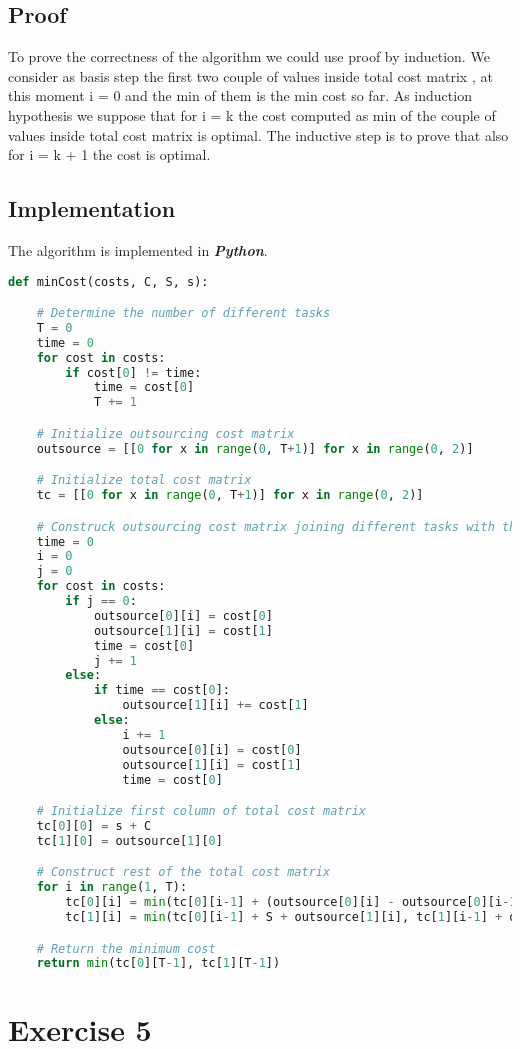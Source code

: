 \documentclass[11pt]{article}
\begin{document}
\subsection{Proof}
To prove the correctness of the algorithm we could use proof by induction.
We consider as basis step the first two couple of values inside total cost matrix , at this moment i = 0
and the min of them is the min cost so far. As induction hypothesis we suppose that for i = k the
cost computed as min of the couple of values inside total cost matrix is optimal. The inductive step is to
prove that also for i = k + 1 the cost is optimal.

\subsection{Implementation}
The algorithm is implemented in \textit{\textbf{Python}}.
\begin{lstlisting}[language=Python, caption=minCost]
def minCost(costs, C, S, s):

	# Determine the number of different tasks
	T = 0
	time = 0
	for cost in costs:
		if cost[0] != time:
			time = cost[0]
			T += 1

	# Initialize outsourcing cost matrix
	outsource = [[0 for x in range(0, T+1)] for x in range(0, 2)]

	# Initialize total cost matrix
	tc = [[0 for x in range(0, T+1)] for x in range(0, 2)]

	# Construck outsourcing cost matrix joining different tasks with the same timestamp
	time = 0
	i = 0
	j = 0
	for cost in costs:
		if j == 0:
			outsource[0][i] = cost[0]
			outsource[1][i] = cost[1]
			time = cost[0]
			j += 1
		else:
			if time == cost[0]:
				outsource[1][i] += cost[1]
			else:
				i += 1
				outsource[0][i] = cost[0]
				outsource[1][i] = cost[1]
				time = cost[0]

	# Initialize first column of total cost matrix 
	tc[0][0] = s + C
	tc[1][0] = outsource[1][0]

	# Construct rest of the total cost matrix 
	for i in range(1, T):
		tc[0][i] = min(tc[0][i-1] + (outsource[0][i] - outsource[0][i-1]) * s, tc[1][i-1] + C + s)
		tc[1][i] = min(tc[0][i-1] + S + outsource[1][i], tc[1][i-1] + outsource[1][i])

	# Return the minimum cost
	return min(tc[0][T-1], tc[1][T-1])
\end{lstlisting}

\section{Exercise 5}
\end{document}
